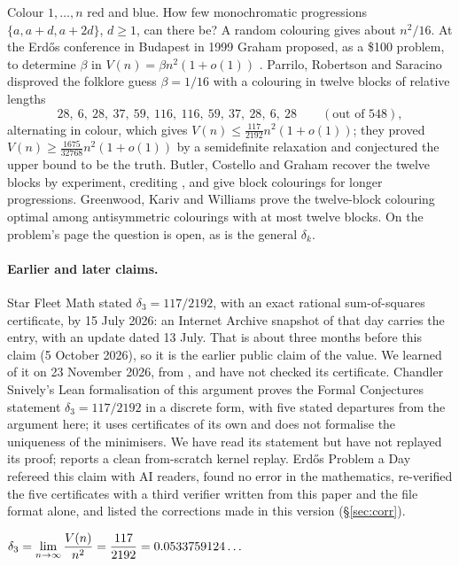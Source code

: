 \documentclass[11pt]{article}
\begin{document}
Colour $1,\dots,n$ red and blue. How few monochromatic progressions $\{a,a+d,a+2d\}$, $d\ge1$, can there be? A random colouring gives about $n^2/16$. At the Erd\H{o}s conference in Budapest in 1999 Graham proposed, as a \$100 problem, to determine $\beta$ in $V(n)=\beta n^2(1+o(1))$ \cite{PRS}. Parrilo, Robertson and Saracino \cite{PRS} disproved the folklore guess $\beta=1/16$ with a colouring in twelve blocks of relative lengths
\[28,\ 6,\ 28,\ 37,\ 59,\ 116,\ 116,\ 59,\ 37,\ 28,\ 6,\ 28\qquad(\text{out of }548),\]
alternating in colour, which gives $V(n)\le\frac{117}{2192}n^2(1+o(1))$; they proved $V(n)\ge\frac{1675}{32768}n^2(1+o(1))$ by a semidefinite relaxation and conjectured the upper bound to be the truth. Butler, Costello and Graham \cite{BCG} recover the twelve blocks by experiment, crediting \cite{PRS}, and give block colourings for longer progressions. Greenwood, Kariv and Williams \cite{GKW} prove the twelve-block colouring optimal among antisymmetric colourings with at most twelve blocks. On the problem's page \cite{EP} the question is open, as is the general $\delta_k$.

\paragraph{Earlier and later claims.} Star Fleet Math \cite{SFM} stated $\delta_3=117/2192$, with an exact rational sum-of-squares certificate, by 15 July 2026: an Internet Archive snapshot of that day carries the entry, with an update dated 13 July. That is about three months before this claim (5 October 2026), so it is the earlier public claim of the value. We learned of it on 23 November 2026, from \cite{EPAD}, and have not checked its certificate. Chandler Snively's Lean formalisation of this argument \cite{Sn} proves the Formal Conjectures statement $\delta_3=117/2192$ in a discrete form, with five stated departures from the argument here; it uses certificates of its own and does not formalise the uniqueness of the minimisers. We have read its statement but have not replayed its proof; \cite{EPAD} reports a clean from-scratch kernel replay. Erd\H{o}s Problem a Day \cite{EPAD} refereed this claim with AI readers, found no error in the mathematics, re-verified the five certificates with a third verifier written from this paper and the file format alone, and listed the corrections made in this version (\S\ref{sec:corr}).

\begin{theorem}\label{thm:main}
$\displaystyle\delta_3=\lim_{n\to\infty}\frac{V(n)}{n^2}=\frac{117}{2192}=0.0533759124\ldots$
\end{theorem}
\end{document}
